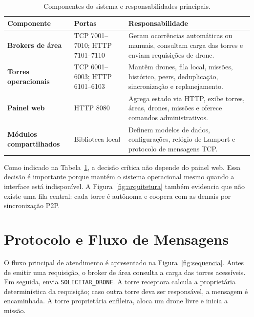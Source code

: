 \documentclass[12pt]{article}
\begin{document}
\begin{table}[H]
\centering
\caption{Componentes do sistema e responsabilidades principais.}
\label{tab:componentes}
\begin{tabularx}{\textwidth}{>{\bfseries}p{2.7cm}p{3.2cm}X}
\toprule
Componente & Portas & Responsabilidade \\
\midrule
Brokers de área & TCP 7001--7010; HTTP 7101--7110 & Geram ocorrências automáticas ou manuais, consultam carga das torres e enviam requisições de drone. \\
Torres operacionais & TCP 6001--6003; HTTP 6101--6103 & Mantêm drones, fila local, missões, histórico, peers, deduplicação, sincronização e replanejamento. \\
Painel web & HTTP 8080 & Agrega estado via HTTP, exibe torres, áreas, drones, missões e oferece comandos administrativos. \\
Módulos compartilhados & Biblioteca local & Definem modelos de dados, configurações, relógio de Lamport e protocolo de mensagens TCP. \\
\bottomrule
\end{tabularx}
\end{table}

Como indicado na Tabela~\ref{tab:componentes}, a decisão crítica não depende do painel web. Essa decisão é importante porque mantém o sistema operacional mesmo quando a interface está indisponível. A Figura~\ref{fig:arquitetura} também evidencia que não existe uma fila central: cada torre é autônoma e coopera com as demais por sincronização P2P.

\section{Protocolo e Fluxo de Mensagens}

O fluxo principal de atendimento é apresentado na Figura~\ref{fig:sequencia}. Antes de emitir uma requisição, o broker de área consulta a carga das torres acessíveis. Em seguida, envia \texttt{SOLICITAR\_DRONE}. A torre receptora calcula a proprietária determinística da requisição; caso outra torre deva ser responsável, a mensagem é encaminhada. A torre proprietária enfileira, aloca um drone livre e inicia a missão.
\end{document}
